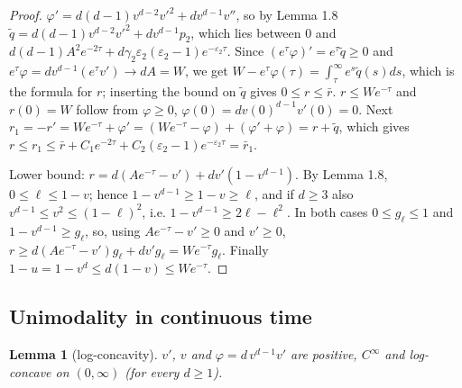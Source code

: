 \documentclass[11pt,a4paper]{article}
\newtheorem{lemma}[theorem]{Lemma}
\theoremstyle{definition}
\theoremstyle{remark}
\begin{document}
\begin{proof}
$\varphi'=d(d-1)v^{d-2}v'^2+dv^{d-1}v''$, so by Lemma 1.8 $\tilde q=d(d-1)v^{d-2}v'^2+dv^{d-1}p_2$, which lies between $0$ and $d(d-1)A^2e^{-2\tau}+d\gamma_2\varepsilon_2(\varepsilon_2-1)e^{-\varepsilon_2\tau}$. Since $(e^\tau\varphi)'=e^\tau\tilde q\ge0$ and $e^\tau\varphi=dv^{d-1}(e^\tau v')\to dA=W$, we get $W-e^\tau\varphi(\tau)=\int_\tau^\infty e^s\tilde q(s)ds$, which is the formula for $r$; inserting the bound on $\tilde q$ gives $0\le r\le\bar r$. $r\le We^{-\tau}$ and $r(0)=W$ follow from $\varphi\ge0$, $\varphi(0)=dv(0)^{d-1}v'(0)=0$. Next $r_1=-r'=We^{-\tau}+\varphi'=(We^{-\tau}-\varphi)+(\varphi'+\varphi)=r+\tilde q$, which gives $r\le r_1\le\bar r+C_1e^{-2\tau}+C_2(\varepsilon_2-1)e^{-\varepsilon_2\tau}=\bar r_1$.

Lower bound: $r=d(Ae^{-\tau}-v')+dv'(1-v^{d-1})$. By Lemma 1.8, $0\le\ell\le1-v$; hence $1-v^{d-1}\ge1-v\ge\ell$, and if $d\ge3$ also $v^{d-1}\le v^2\le(1-\ell)^2$, i.e. $1-v^{d-1}\ge2\ell-\ell^2$. In both cases $0\le g_\ell\le1$ and $1-v^{d-1}\ge g_\ell$, so, using $Ae^{-\tau}-v'\ge0$ and $v'\ge0$, $r\ge d(Ae^{-\tau}-v')g_\ell+dv'g_\ell=We^{-\tau}g_\ell$. Finally $1-u=1-v^d\le d(1-v)\le We^{-\tau}$.
\end{proof}

\subsection{Unimodality in continuous time}

\begin{lemma}[{log-concavity}]
$v'$, $v$ and $\varphi=d\,v^{d-1}v'$ are positive, $C^\infty$ and log-concave on $(0,\infty)$ (for every $d\ge1$).
\end{lemma}
\end{document}
